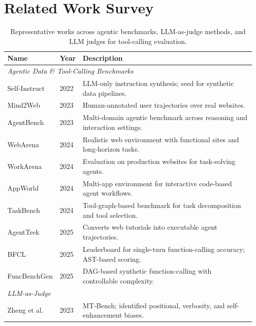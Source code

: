 \section{Related Work Survey}
\label{app:relwork-table}

\begin{table}[!htbp]
\centering
\caption{Representative works across agentic benchmarks, LLM-as-judge methods, and LLM judges for tool-calling evaluation.}
\label{tab:overview}
\small
\renewcommand{\arraystretch}{0.95}
\setlength{\tabcolsep}{4pt}
\begin{tabularx}{\textwidth}{l l X}
\toprule
\textbf{Name} & \textbf{Year} & \textbf{Description} \\
\midrule
\multicolumn{3}{l}{\textit{Agentic Data \& Tool-Calling Benchmarks}} \\
\midrule
Self-Instruct \cite{wang2022selfinstruct} & 2022 & LLM-only instruction synthesis; seed for synthetic data pipelines. \\
Mind2Web \cite{deng2023mind2web} & 2023 & Human-annotated user trajectories over real websites. \\
AgentBench \cite{liu2023agentbench} & 2023 & Multi-domain agentic benchmark across reasoning and interaction settings. \\
WebArena \cite{zhou2024webarena} & 2024 & Realistic web environment with functional sites and long-horizon tasks. \\
WorkArena \cite{drouin2024workarena} & 2024 & Evaluation on production websites for task-solving agents. \\
AppWorld \cite{trivedi2024appworld} & 2024 & Multi-app environment for interactive code-based agent workflows. \\
TaskBench \cite{shen2024taskbench} & 2024 & Tool-graph-based benchmark for task decomposition and tool selection. \\
AgentTrek \cite{xu2025agenttrek} & 2025 & Converts web tutorials into executable agent trajectories. \\
BFCL \cite{patil2025bfcl} & 2025 & Leaderboard for single-turn function-calling accuracy; AST-based scoring. \\
FuncBenchGen \cite{funcbenchgen2025} & 2025 & DAG-based synthetic function-calling with controllable complexity. \\
\midrule
\multicolumn{3}{l}{\textit{LLM-as-Judge}} \\
\midrule
Zheng et al. \cite{zheng2023judging} & 2023 & MT-Bench; identified positional, verbosity, and self-enhancement biases. \\

\end{tabularx}
\end{table}
